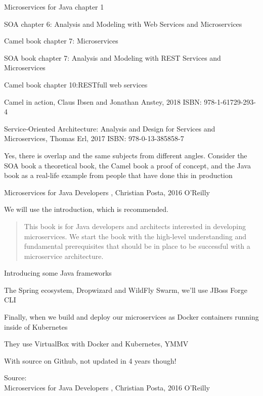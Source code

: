 \documentclass[Screen16to9,17pt]{foils}
\begin{document}
\begin{list1}
\item Microservices for Java chapter 1
\item SOA chapter 6: Analysis and Modeling with Web Services and Microservices
\item Camel book chapter 7: Microservices
\vskip 1cm
\item SOA book chapter 7: Analysis and Modeling with REST Services and Microservices
\item Camel book chapter 10:RESTfull web services
\end{list1}

Camel in action, Claus Ibsen and Jonathan Anstey, 2018
ISBN: 978-1-61729-293-4

Service‑Oriented Architecture: Analysis and Design for Services and Microservices, Thomas Erl, 2017
ISBN: 978-0-13-385858-7

Yes, there is overlap and the same subjects from different angles. Consider the SOA book a theoretical book, the Camel book a proof of concept, and the Java book as a real-life example from people that have done this in production



Microservices for Java Developers , Christian Posta, 2016 O’Reilly\\

We will use the introduction, which is recommended.


\begin{quote}
This book is for Java developers and architects interested in developing microservices. We start the book with the high-level understanding and fundamental prerequisites that should be in place to be successful with a microservice architecture.
\end{quote}

Introducing some Java frameworks
\begin{list2}
\item The Spring ecosystem, Dropwizard and WildFly Swarm, we’ll use JBoss Forge CLI
\item Finally, when we build and deploy our microservices as Docker containers running inside of Kubernetes
\item They use VirtualBox with Docker and Kubernetes, YMMV
\item With source on Github, not updated in 4 years though!\\
\end{list2}
Source: {\footnotesize\\
Microservices for Java Developers , Christian Posta, 2016 O’Reilly}
\end{document}
